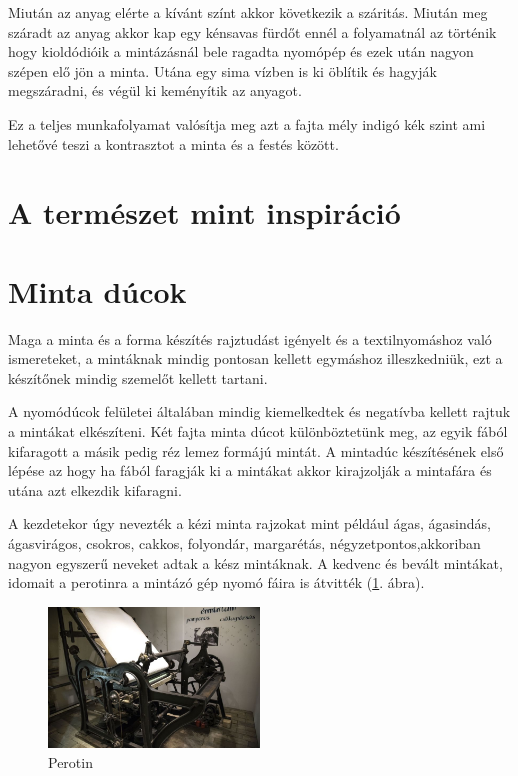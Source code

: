 \documentclass[fontsize=12pt, appendixprefix=true]{scrreprt}
\begin{document}
Miután az anyag elérte a kívánt színt akkor következik a száritás. Miután meg száradt az anyag akkor kap egy kénsavas fürdőt ennél a folyamatnál az történik hogy kioldódióik a mintázásnál bele ragadta nyomópép és ezek után nagyon szépen elő jön a minta. Utána egy sima vízben is ki öblítik és hagyják megszáradni, és végül ki keményítik az anyagot.

Ez a teljes munkafolyamat valósítja  meg azt a fajta mély indigó kék szint ami lehetővé teszi a kontrasztot a minta és a festés között.


\section{A természet mint inspiráció}
\section{Minta dúcok}
Maga a minta és a forma készítés rajztudást igényelt és a textilnyomáshoz való ismereteket, a mintáknak mindig pontosan kellett egymáshoz illeszkedniük, ezt a készítőnek mindig szemelőt kellett tartani.

A nyomódúcok felületei általában mindig kiemelkedtek és negatívba kellett rajtuk a mintákat elkészíteni. Két fajta minta dúcot különböztetünk meg, az egyik fából kifaragott a másik pedig réz lemez formájú mintát. A mintadúc készítésének első lépése az hogy ha fából faragják ki a mintákat akkor kirajzolják a mintafára és utána azt elkezdik kifaragni. 

A kezdetekor úgy nevezték a kézi minta rajzokat mint például ágas, ágasindás, ágasvirágos, csokros, cakkos, folyondár, margarétás, négyzetpontos,akkoriban nagyon egyszerű neveket adtak a kész mintáknak. A kedvenc és bevált mintákat, idomait a perotinra a mintázó gép nyomó fáira is átvitték (\ref{fig:perotin}. ábra).

\begin{figure}[h!]
	\centering
	\includegraphics[width=0.5\textwidth]{img/201603-perrotin.jpg}
	\caption{Perotin}
	\label{fig:perotin}
\end{figure}
\end{document}
